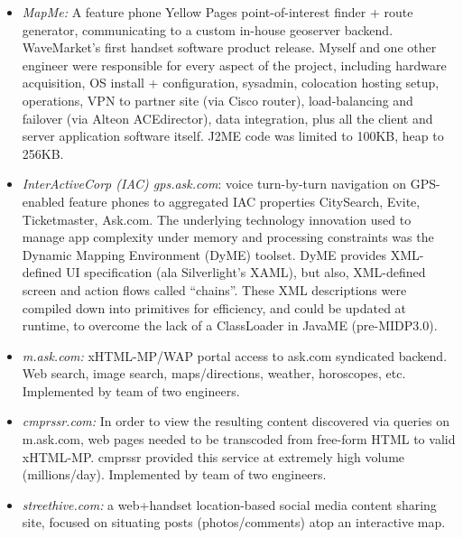        \begin{itemize}
         \item  {\em MapMe:} A feature phone Yellow Pages
         point-of-interest finder + route generator, communicating to
         a custom in-house geoserver backend.  WaveMarket's first handset software 
         product release. Myself and 
         one other engineer were responsible for every aspect of the project, including 
         hardware acquisition, OS install + configuration, sysadmin,
         colocation hosting setup, operations, VPN to partner site (via Cisco router), load-balancing 
         and failover (via Alteon ACEdirector), data integration, plus all the client and server 
         application software itself. J2ME code was limited to 100KB, heap to 256KB. \\[-18pt]
         \item  {\em InterActiveCorp (IAC) gps.ask.com}: voice turn-by-turn navigation
           on GPS-enabled feature phones to aggregated IAC properties CitySearch,
           Evite, Ticketmaster, Ask.com.  The underlying technology innovation used to 
           manage app complexity under memory and processing constraints was the 
           Dynamic Mapping Environment (DyME) toolset.  DyME provides XML-defined UI 
           specification (ala Silverlight's XAML), but also,
           XML-defined screen and action flows called ``chains''.  These XML descriptions were
           compiled down into primitives for efficiency, and could be updated at runtime, to overcome
           the lack of a ClassLoader in JavaME (pre-MIDP3.0).  \\[-18pt]
        \item  {\em m.ask.com:} xHTML-MP/WAP portal access to ask.com syndicated backend.  
          Web search, image search, maps/directions, weather, horoscopes, etc.
          Implemented by team of two engineers. \\[-18pt]
         \item  {\em cmprssr.com:} In order to view the resulting content discovered via queries on 
         m.ask.com, web pages needed to be transcoded from free-form HTML to valid xHTML-MP.
         cmprssr provided this service at extremely high volume (millions/day).
         Implemented by team of two engineers. \\[-18pt]
         \item  {\em streethive.com:} a web+handset location-based social media content 
          sharing site, focused on situating posts (photos/comments) atop an interactive map.  

\end{itemize}
